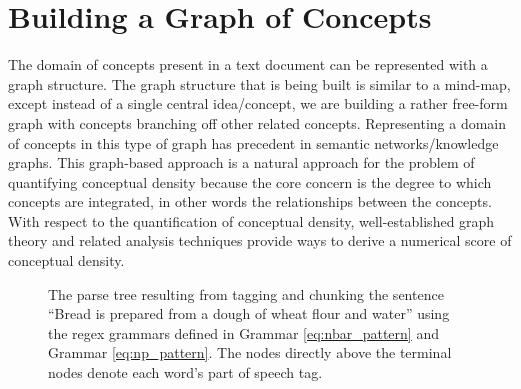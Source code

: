 \documentclass[12pt]{article}
\theoremstyle{grammarstyle}
\begin{document}
\section{Building a Graph of Concepts} \label{sec:building_a_mind-map}
The domain of concepts present in a text document can be represented with a graph structure. The graph structure that is being built is similar to a mind-map, except instead of a single central idea/concept, we are building a rather free-form graph with concepts branching off other related concepts. Representing a domain of concepts in this type of graph has precedent in semantic networks/knowledge graphs. This graph-based approach is a natural approach for the problem of quantifying conceptual density because the core concern is the degree to which concepts are integrated, in other words the relationships between the concepts. With respect to the quantification of conceptual density, well-established graph theory and related analysis techniques  provide ways to derive a numerical score of conceptual density. 

\begin{figure}
    \centering
    \caption{The parse tree resulting from tagging and chunking the sentence ``Bread is prepared from a dough of wheat flour and water'' using the regex grammars defined in Grammar \ref{eq:nbar_pattern} and Grammar \ref{eq:np_pattern}. The nodes directly above the terminal nodes denote each word's part of speech tag.}
    \label{fig:parse_tree_example}
\end{figure}
\end{document}
